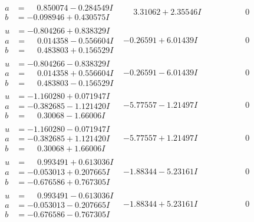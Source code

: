 \documentclass[1p]{elsarticle_modified}
\theoremstyle{definition}
\begin{document}
$$\begin{array}{c|c|c}
\begin{aligned}
a &= \phantom{-}0.850074 - 0.284549 I \\
b &= -0.098946 + 0.430575 I\end{aligned}
 & \phantom{-}3.31062 + 2.35546 I & \phantom{-0.000000 } 0 \\ \hline\begin{aligned}
u &= -0.804266 + 0.838329 I \\
a &= \phantom{-}0.014358 - 0.556604 I \\
b &= \phantom{-}0.483803 + 0.156529 I\end{aligned}
 & -0.26591 + 6.01439 I & \phantom{-0.000000 } 0 \\ \hline\begin{aligned}
u &= -0.804266 - 0.838329 I \\
a &= \phantom{-}0.014358 + 0.556604 I \\
b &= \phantom{-}0.483803 - 0.156529 I\end{aligned}
 & -0.26591 - 6.01439 I & \phantom{-0.000000 } 0 \\ \hline\begin{aligned}
u &= -1.160280 + 0.071947 I \\
a &= -0.382685 - 1.121420 I \\
b &= \phantom{-}0.30068 - 1.66006 I\end{aligned}
 & -5.77557 - 1.21497 I & \phantom{-0.000000 } 0 \\ \hline\begin{aligned}
u &= -1.160280 - 0.071947 I \\
a &= -0.382685 + 1.121420 I \\
b &= \phantom{-}0.30068 + 1.66006 I\end{aligned}
 & -5.77557 + 1.21497 I & \phantom{-0.000000 } 0 \\ \hline\begin{aligned}
u &= \phantom{-}0.993491 + 0.613036 I \\
a &= -0.053013 + 0.207665 I \\
b &= -0.676586 + 0.767305 I\end{aligned}
 & -1.88344 - 5.23161 I & \phantom{-0.000000 } 0 \\ \hline\begin{aligned}
u &= \phantom{-}0.993491 - 0.613036 I \\
a &= -0.053013 - 0.207665 I \\
b &= -0.676586 - 0.767305 I\end{aligned}
 & -1.88344 + 5.23161 I & \phantom{-0.000000 } 0 \\ \hline\begin{aligned}

\end{aligned}
\end{array}$$
\end{document}
